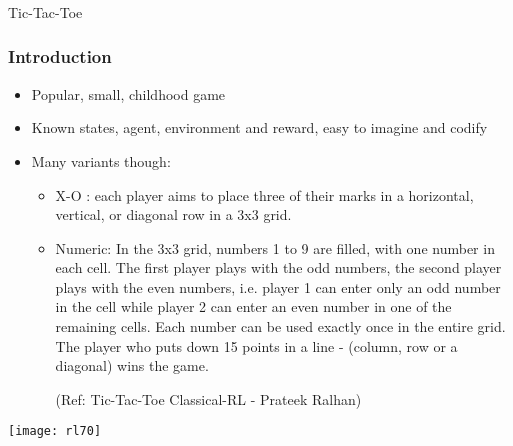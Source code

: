 \begin{frame}[fragile]\frametitle{}
\begin{center}
{\Large Tic-Tac-Toe}
\end{center}
\end{frame}


\begin{frame}[fragile]\frametitle{Introduction}



\begin{itemize}
\item Popular, small, childhood game
\item Known states, agent, environment and reward, easy to imagine and codify
\item Many variants though:
	\begin{itemize}
	\item X-O : each player aims to place three of their marks in a horizontal, vertical, or diagonal row in a 3x3 grid. 
	\item Numeric: In the 3x3 grid, numbers 1 to 9 are filled, with one number in each cell. The first player plays with the odd numbers, the second player plays with the even numbers, i.e. player 1 can enter only an odd number in the cell while player 2 can enter an even number in one of the remaining cells. Each number can be used exactly once in the entire grid. The player who puts down 15 points in a line - (column, row or a diagonal) wins the game.
	
	{\tiny (Ref: Tic-Tac-Toe Classical-RL - Prateek Ralhan)}
	\end{itemize}
\end{itemize}


\begin{center}
\texttt{[image: rl70]}
\end{center}


\end{frame}

